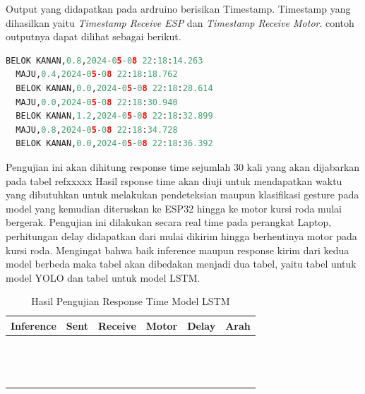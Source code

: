 Output yang didapatkan pada ardruino berisikan Timestamp. Timestamp yang dihasilkan yaitu \emph{Timestamp Receive ESP} dan \emph{Timestamp Receive Motor}. contoh outputnya dapat dilihat sebagai berikut.

\begin{lstlisting}[language=python]
  BELOK KANAN,0.8,2024-05-08 22:18:14.263
  MAJU,0.4,2024-05-08 22:18:18.762
  BELOK KANAN,0.0,2024-05-08 22:18:28.614
  MAJU,0.0,2024-05-08 22:18:30.940
  BELOK KANAN,1.2,2024-05-08 22:18:32.899
  MAJU,0.8,2024-05-08 22:18:34.728
  BELOK KANAN,0.0,2024-05-08 22:18:36.392
\end{lstlisting}

Pengujian ini akan dihitung response time sejumlah 30 kali yang akan dijabarkan pada tabel refxxxxx Hasil rsponse time akan diuji untuk mendapatkan waktu yang dibutuhkan untuk melakukan pendeteksian maupun klasifikasi gesture pada model yang kemudian diteruskan ke ESP32 hingga ke motor kursi roda mulai bergerak. Pengujian ini dilakukan secara real time pada perangkat Laptop, perhitungan delay didapatkan dari mulai dikirim hingga berhentinya motor pada kursi roda. Mengingat bahwa baik inference maupun response kirim dari kedua model berbeda maka tabel akan dibedakan menjadi dua tabel, yaitu tabel untuk model YOLO dan tabel untuk model LSTM.

\begin{table}[H]
  \centering
  \label{tb:TabelHasilPengujianResponseTimeLSTM}
  \caption{Hasil Pengujian Response Time Model LSTM}
  \begin{tabular}{|l|l|l|l|l|l|}
  \hline
  Inference & Sent & Receive & Motor & Delay & Arah \\ \hline
            &      &         &       &       &      \\ \hline
            &      &         &       &       &      \\ \hline
            &      &         &       &       &      \\ \hline
            &      &         &       &       &      \\ \hline
            &      &         &       &       &      \\ \hline
            &      &         &       &       &      \\ \hline
            &      &         &       &       &      \\ \hline
            &      &         &       &       &      \\ \hline
            &      &         &       &       &      \\ \hline
            &      &         &       &       &      \\ \hline
            &      &         &       &       &      \\ \hline
            &      &         &       &       &      \\ \hline
            &      &         &       &       &      \\ \hline
            &      &         &       &       &      \\ \hline
  \end{tabular}
  \end{table}

